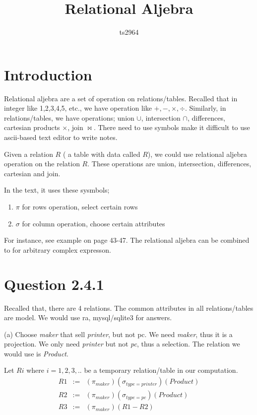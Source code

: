 \documentclass{article}
\title{Relational Aljebra}
\author{ts2964}
\begin{document}
\maketitle

\section{Introduction}
Relational aljebra are a set of operation on relations/tables. Recalled that in integer like 1,2,3,4,5, etc., we have operation like $+,-,\times, \div $.
Similarly, in relations/tables, we have operations; union $\cup$, intersection $\cap$, differences, cartesian products $\times$, join $\Join$. There need to use symbols make it difficult to use ascii-based text editor to write notes.

Given a relation $R$ ( a table with data called $R$), we could use relational aljebra operation on the relation $R$. These operations are union, intersection, differences, cartesian and join.

In  the text, it uses these sysmbols;
\begin{enumerate}
\item $\pi$ for rows operation, select certain rows
\item $\sigma$ for column operation, choose certain attributes
\end{enumerate}

For instance, see example on page 43-47.
The relational aljebra can be combined to for arbitrary complex expresson.

\section{Question 2.4.1}

Recalled that, there are 4 relations. The common attributes in all relations/tables are model. We would use ra, mysql/sqlite3 for answers.

(a) Choose \textit{maker} that sell \textit{printer}, but not {pc}. We need \textit{maker}, thus it is a projection. We only need \textit{printer} but not \textit{pc}, thus a selection. The relation we would use is \textit{Product}.

Let $Ri$ where $i=1,2,3,..$ be a temporary relation/table in our computation.
\begin{eqnarray}
R1 &:=&  (\pi_{maker})(\sigma_{type=printer})(Product) \\
R2 &:=&  (\pi_{maker})(\sigma_{type=pc})(Product) \\
R3 &:=& (\pi_{maker})(R1 - R2) 
\end{eqnarray}
\end{document}
